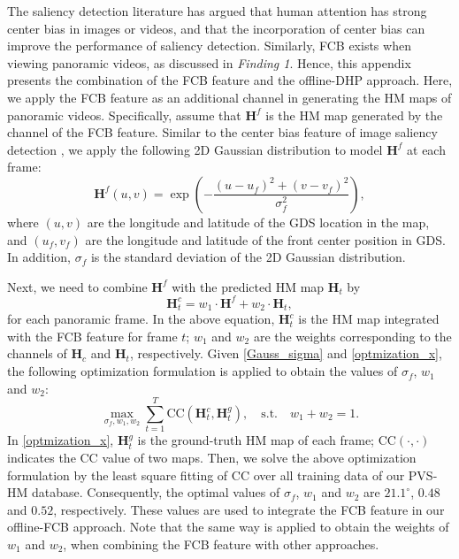 \documentclass[10pt,journal,compsoc]{IEEEtran}
\begin{document}
The saliency detection literature \cite{judd2009learning} has argued that human attention has strong center bias in images or videos, and that the incorporation of center bias can improve the performance of saliency detection. Similarly, FCB exists when viewing panoramic videos, as discussed in \textit{Finding 1}. Hence, this appendix presents the combination of the FCB feature and the offline-DHP approach. Here, we apply the FCB feature as an additional channel in generating the HM maps of panoramic videos. Specifically, assume that $\mathbf{H}^f$ is the HM map generated by the channel of the FCB feature. Similar to the center bias feature of image saliency detection \cite{judd2009learning}, we apply the following 2D Gaussian distribution to model $\mathbf{H}^f$ at each frame:
\begin{equation}
\label{Gauss_sigma}
\mathbf{H}^f(u,v)= \exp\left({-\frac{(u-u_f)^2+(v-v_f)^2}{\sigma_f^2}}\right),
\end{equation}
where $(u,v)$ are the longitude and latitude of the GDS location in the map, and $(u_f,v_f)$ are the longitude and latitude of the front center position in GDS. In addition, $\sigma_f$ is the standard deviation of  the 2D Gaussian distribution.

Next, we need to combine $\mathbf{H}^f$ with the predicted HM map $\mathbf{H}_t$ by
\begin{equation}
\label{optmization_x}
\mathbf{H}^c_t = w_1\cdot \mathbf{H}^f+w_2\cdot \mathbf{H}_t,
\end{equation}
for each panoramic frame. In the above equation, $\mathbf{H}^c_t$ is the HM map integrated with the FCB feature for frame $t$; $w_1$ and $w_2$ are the weights corresponding to the channels of $\mathbf{H}_c$ and $\mathbf{H}_t$, respectively. Given \eqref{Gauss_sigma} and \eqref{optmization_x}, the following optimization formulation is applied to obtain the values of $\sigma_f$, $w_1$ and $w_2$:
\begin{equation}
\label{optmization_w}
\max_{\sigma_f,w_1,w_2} \sum_{t=1}^{T} \text{CC}(\mathbf{H}^c_t, \mathbf{H}^g_t), \quad \text{s.t.} \quad w_1+w_2=1.
\end{equation}
In \eqref{optmization_x}, $\mathbf{H}^g_t$ is the ground-truth HM map of each frame; $\text{CC}(\cdot,\cdot)$ indicates the CC value of two maps. Then, we solve the above optimization formulation by the least square fitting of CC over all training data of our PVS-HM database. Consequently, the optimal values of $\sigma_f$, $w_1$ and $w_2$ are $21.1^\circ$, $0.48$ and $0.52$, respectively. These values are used to integrate the FCB feature in our offline-FCB approach. Note that the same way is applied to obtain the weights of $w_1$ and $w_2$, when combining the FCB feature with other approaches.
\end{document}
